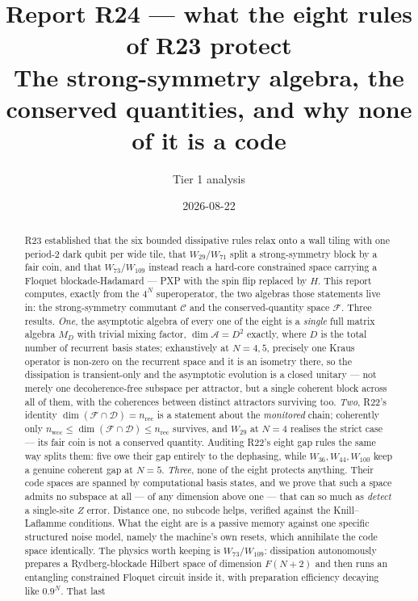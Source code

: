\documentclass[11pt]{article}
\title{\textbf{Report R24 --- what the eight rules of R23 protect}\\
\large The strong-symmetry algebra, the conserved quantities, and why none of
it is a code}
\author{Tier 1 analysis}
\date{2026-08-22}
\newcommand{\C}{\mathcal{C}}
\newcommand{\F}{\mathcal{F}}
\newcommand{\D}{\mathcal{D}}
\newcommand{\A}{\mathcal{A}}
\theoremstyle{plain}
\theoremstyle{remark}
\begin{document}
\maketitle

\begin{abstract}
R23 established that the six bounded dissipative rules relax onto a wall tiling
with one period-2 dark qubit per wide tile, that $W_{29}/W_{71}$ split a
strong-symmetry block by a fair coin, and that $W_{73}/W_{109}$ instead reach a
hard-core constrained space carrying a Floquet blockade-Hadamard --- PXP with
the spin flip replaced by $H$. This report computes, exactly from the $4^N$
superoperator, the two algebras those statements live in: the strong-symmetry
commutant $\C$ and the conserved-quantity space $\F$. Three results. \emph{One},
the asymptotic algebra of every one of the eight is a \emph{single} full matrix
algebra $M_D$ with trivial mixing factor, $\dim\A = D^2$ exactly, where $D$ is
the total number of recurrent basis states; exhaustively at $N=4,5$, precisely
one Kraus operator is non-zero on the recurrent space and it is an isometry
there, so the dissipation is transient-only and the asymptotic evolution is a
closed unitary --- not merely one decoherence-free subspace per attractor, but a
single coherent block across all of them, with the coherences between distinct
attractors surviving too. \emph{Two}, R22's identity
$\dim(\F\cap\D) = n_{\mathrm{rec}}$ is a statement about the \emph{monitored}
chain; coherently only $n_{\mathrm{wcc}} \le \dim(\F\cap\D) \le
n_{\mathrm{rec}}$ survives, and $W_{29}$ at $N=4$ realises the strict case ---
its fair coin is not a conserved quantity. Auditing R22's eight gap rules the
same way splits them: five owe their gap entirely to the dephasing, while
$W_{36}, W_{44}, W_{100}$ keep a genuine coherent gap at $N=5$. \emph{Three},
none of the eight protects anything. Their code spaces are spanned by
computational basis states, and we prove that such a space admits no subspace at
all --- of any dimension above one --- that can so much as \emph{detect} a
single-site $Z$ error. Distance one, no subcode helps, verified against the
Knill--Laflamme conditions. What the eight are is a passive memory against one
specific structured noise model, namely the machine's own resets, which
annihilate the code space identically. The physics worth keeping is
$W_{73}/W_{109}$: dissipation autonomously prepares a Rydberg-blockade Hilbert
space of dimension $F(N+2)$ and then runs an entangling constrained Floquet
circuit inside it, with preparation efficiency decaying like $0.9^N$. That last

\end{abstract}
\end{document}
